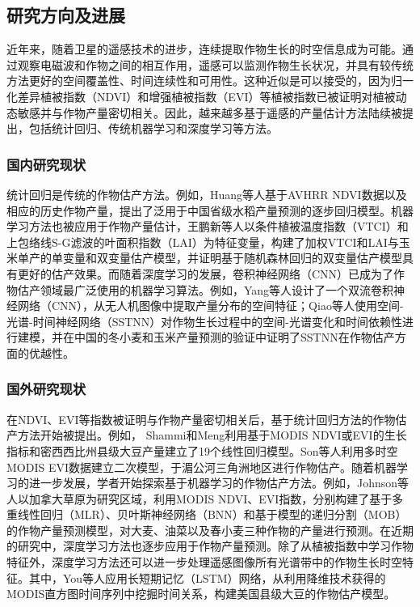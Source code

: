 \subsection{研究方向及进展}

\par 近年来，随着卫星的遥感技术的进步，连续提取作物生长的时空信息成为可能。通过观察电磁波和作物之间的相互作用\cite{guan2017shared, zhang2003monitoring}，遥感可以监测作物生长状况，并具有较传统方法更好的空间覆盖性、时间连续性和可用性\cite{claverie2013validation}。这种近似是可以接受的，因为归一化差异植被指数（NDVI）和增强植被指数（EVI）等植被指数已被证明对植被动态敏感\cite{sellers1987canopy, tucker1979red}并与作物产量密切相关\cite{shanahan2001use}。因此，越来越多基于遥感的产量估计方法陆续被提出，包括统计回归、传统机器学习和深度学习等方法。

\subsubsection {国内研究现状}

\par 统计回归是传统的作物估产方法。例如，Huang等人\cite{huang2013remotely}基于AVHRR NDVI数据以及相应的历史作物产量，提出了泛用于中国省级水稻产量预测的逐步回归模型。机器学习方法也被应用于作物产量估计，王鹏新等人\cite{NYJX201907026}以条件植被温度指数（VTCI）和上包络线S-G滤波的叶面积指数（LAI）为特征变量，构建了加权VTCI和LAI与玉米单产的单变量和双变量估产模型，并证明基于随机森林回归的双变量估产模型具有更好的估产效果。而随着深度学习的发展，卷积神经网络（CNN）已成为了作物估产领域最广泛使用的机器学习算法\cite{van2020crop}。例如，Yang等人设计了一个双流卷积神经网络（CNN），从无人机图像中提取产量分布的空间特征\cite{yang2019deep}；Qiao等人使用空间-光谱-时间神经网络（SSTNN）对作物生长过程中的空间-光谱变化和时间依赖性进行建模\cite{qiao2021crop}，并在中国的冬小麦和玉米产量预测的验证中证明了SSTNN在作物估产方面的优越性。

\subsubsection {国外研究现状}

\par 在NDVI、EVI等指数被证明与作物产量密切相关后，基于统计回归方法的作物估产方法开始被提出。例如， Shammi和Meng\cite{shammi2021use}利用基于MODIS NDVI或EVI的生长指标和密西西比州县级大豆产量建立了19个线性回归模型。Son等人\cite{son2014comparative}利用多时空MODIS EVI数据建立二次模型，于湄公河三角洲地区进行作物估产。随着机器学习的进一步发展，学者开始探索基于机器学习的作物估产方法。例如，Johnson等人\cite{johnson2016crop}以加拿大草原为研究区域，利用MODIS NDVI、EVI指数，分别构建了基于多重线性回归（MLR）、贝叶斯神经网络（BNN）和基于模型的递归分割（MOB）的作物产量预测模型，对大麦、油菜以及春小麦三种作物的产量进行预测。在近期的研究中，深度学习方法也逐步应用于作物产量预测。除了从植被指数中学习作物特征外，深度学习方法还可以进一步处理遥感图像所有光谱带中的作物生长时空特征。其中，You等人应用长短期记忆（LSTM）网络，从利用降维技术获得的MODIS直方图时间序列中挖掘时间关系，构建美国县级大豆的作物估产模型\cite{you2017deep}。

